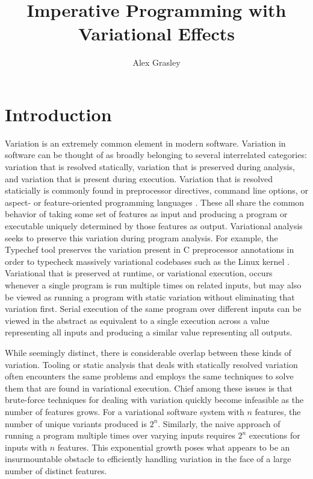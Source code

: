 \documentclass[12pt,oneside]{book}
\title{Imperative Programming with Variational Effects}
\author{Alex Grasley}
\begin{document}
\maketitle

\mainmatter

\chapter{Introduction}
\label{ch:intro}

Variation is an extremely common element in modern software. Variation in software can be
thought of as broadly belonging to several interrelated categories: variation that is resolved statically, variation that is preserved during analysis,
and variation that is present during execution.
Variation that is resolved staticially is commonly found in preprocessor directives, command line options, or aspect- or feature-oriented
programming languages \cite{apel2008feature,kiczales1997aspect,prehofer1997feature}.
These all share the common behavior of taking some set of features as input and
producing a program or executable uniquely determined by those features as output. Variational analysis seeks to preserve this variation during program analysis.
For example, the Typechef tool preserves the variation present in C preprocessor annotations in order to typecheck massively variational codebases such as
the Linux kernel \cite{kenner2010typechef}.
Variational that is preserved at runtime, or variational execution, occurs whenever a single
program is run multiple times on related inputs, but may also be viewed as running a program with static variation without eliminating that variation first.
Serial execution of the same program over different inputs can be viewed in the abstract
as equivalent to a single execution across a value representing all inputs and producing a similar value representing all outputs.

While seemingly distinct, there is considerable overlap between these kinds of variation. Tooling or static analysis that deals with
statically resolved variation often encounters the same problems and employs the same techniques to solve them
that are found in variational execution. Chief among these issues is that brute-force techniques for dealing with variation quickly become infeasible as the
number of features grows. For a variational software system with $n$ features, the number of unique variants produced is $2^n$. Similarly, the naive approach
of running a program multiple times over varying inputs requires $2^n$ executions for inputs with $n$ features. This exponential growth poses what appears to
be an insurmountable obstacle to efficiently handling variation in the face of a large number of distinct features.
\end{document}
